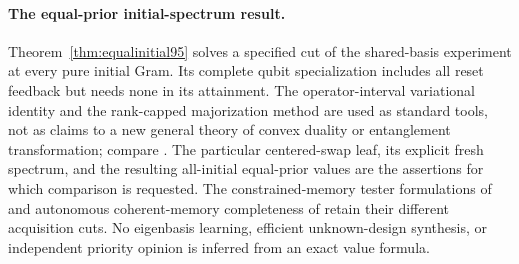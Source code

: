 \paragraph{The equal-prior initial-spectrum result.}
Theorem~\ref{thm:equalinitial95} solves a specified cut of the
shared-basis experiment at every pure initial Gram.  Its complete
qubit specialization includes all reset feedback but needs none in
its attainment.  The operator-interval variational identity and the
rank-capped majorization method are used as standard tools, not as
claims to a new general theory of convex duality or entanglement
transformation; compare \cite{Nielsen94,JonathanPlenio94}.
The particular centered-swap leaf, its explicit fresh spectrum, and the
resulting all-initial equal-prior values are the assertions for which
comparison is requested.  The constrained-memory tester formulations
of \cite{OZNPQ89} and autonomous coherent-memory completeness of
\cite{ZB90} retain their different acquisition cuts.  No eigenbasis
learning, efficient unknown-design synthesis, or independent priority
opinion is inferred from an exact value formula.
